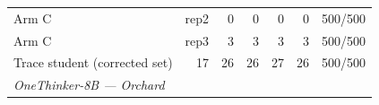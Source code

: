 \begin{table}[t]
{\begin{tabular}{lrrrrrr}
Arm C & rep2 & 0 & 0 & 0 & 0 & 500/500 \\
Arm C & rep3 & 3 & 3 & 3 & 3 & 500/500 \\
Trace student (corrected set) & 17 & 26 & 26 & 27 & 26 & 500/500 \\
\midrule
\multicolumn{7}{l}{\textit{OneThinker-8B --- Orchard}} \\

\end{tabular}}
\end{table}
